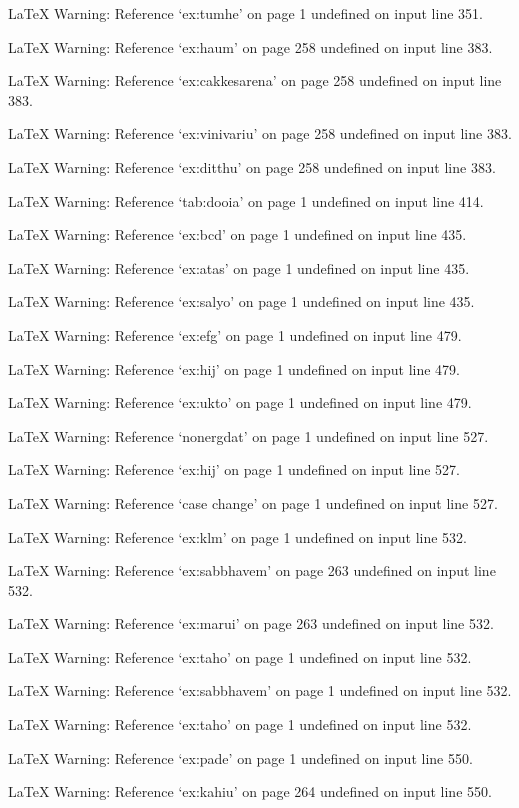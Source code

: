 LaTeX Warning: Reference `ex:tumhe' on page 1 undefined on input line 351.


LaTeX Warning: Reference `ex:haum' on page 258 undefined on input line 383.


LaTeX Warning: Reference `ex:cakkesarena' on page 258 undefined on input line 383.


LaTeX Warning: Reference `ex:vinivariu' on page 258 undefined on input line 383.


LaTeX Warning: Reference `ex:ditthu' on page 258 undefined on input line 383.


LaTeX Warning: Reference `tab:dooia' on page 1 undefined on input line 414.


LaTeX Warning: Reference `ex:bcd' on page 1 undefined on input line 435.


LaTeX Warning: Reference `ex:atas' on page 1 undefined on input line 435.


LaTeX Warning: Reference `ex:salyo' on page 1 undefined on input line 435.


LaTeX Warning: Reference `ex:efg' on page 1 undefined on input line 479.


LaTeX Warning: Reference `ex:hij' on page 1 undefined on input line 479.


LaTeX Warning: Reference `ex:ukto' on page 1 undefined on input line 479.


LaTeX Warning: Reference `nonergdat' on page 1 undefined on input line 527.


LaTeX Warning: Reference `ex:hij' on page 1 undefined on input line 527.


LaTeX Warning: Reference `case change' on page 1 undefined on input line 527.


LaTeX Warning: Reference `ex:klm' on page 1 undefined on input line 532.


LaTeX Warning: Reference `ex:sabbhavem' on page 263 undefined on input line 532.


LaTeX Warning: Reference `ex:marui' on page 263 undefined on input line 532.


LaTeX Warning: Reference `ex:taho' on page 1 undefined on input line 532.


LaTeX Warning: Reference `ex:sabbhavem' on page 1 undefined on input line 532.


LaTeX Warning: Reference `ex:taho' on page 1 undefined on input line 532.


LaTeX Warning: Reference `ex:pade' on page 1 undefined on input line 550.


LaTeX Warning: Reference `ex:kahiu' on page 264 undefined on input line 550.



